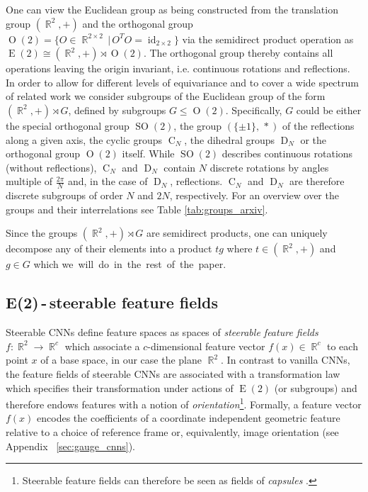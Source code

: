 \documentclass{article}
\newcommand{\apx}{Appendix\xspace
}
\DeclareMathOperator*{\R}{\mathbb{R}}
\newcommand{\E}[1]{\ensuremath{\operatorname{E}(#1)}}
\renewcommand{\O}[1]{\ensuremath{\operatorname{O}(#1)}}
\newcommand{\SO}[1]{\ensuremath{\operatorname{SO}(#1)}}
\newcommand{\DN}{\ensuremath{\operatorname{D}_{\!N}}}
\newcommand{\CN}{\ensuremath{\operatorname{C}_{\!N}}}
\newlength{\secBefore}
\newlength{\secAfter}
\newlength{\subsecBefore}
\newlength{\subsecAfter}
\begin{document}
One can view the Euclidean group as being constructed from the translation group $(\R^2,+)$ and the orthogonal group $\O2=\{O\in\R^{2\times2} \,|\, O^TO=\operatorname{id}_{2\times2}\}$ via the semidirect product operation as $\E2\cong(\R^2,+)\rtimes\O2$.
The orthogonal group thereby contains all operations leaving the origin invariant, i.e. continuous rotations and reflections.
In order to allow for different levels of equivariance and to cover a wide spectrum of related work we consider subgroups of the Euclidean group of the form $(\R^2,+)\rtimes G$, defined by subgroups $G\leq\O2$.
Specifically, $G$ could be either the special orthogonal group $\SO2$, the group $(\{\pm1\},\,*)$ of the reflections along a given axis, the cyclic groups $\CN$, the dihedral groups $\DN$ or the orthogonal group $\O2$ itself.
While $\SO2$ describes continuous rotations (without reflections), $\CN$ and $\DN$ contain $N$ discrete rotations by angles multiple of $\frac{2\pi}{N}$ and, in the case of $\DN$, reflections.
$\CN$ and $\DN$ are therefore discrete subgroups of order $N$ and $2N$, respectively.
For an overview over the groups and their interrelations see Table \ref{tab:groups_arxiv}.

Since the groups $(\R^2,+)\rtimes G$ are semidirect products, one can uniquely decompose any of their elements into a product $tg$ where $t\in(\R^2,+)$ and $g\in G$ \cite{Cohen2018-IIR} which \mbox{we will do in the rest of the paper.}

 	

\vspace*{\subsecBefore}
\subsection{E(2)\,-\,steerable feature fields}
\label{sec:feature_fields}
\vspace*{\subsecAfter}


Steerable CNNs define feature spaces as spaces of \emph{steerable feature fields}
$f:\R^2\to\R^c$ which associate a $c$-dimensional feature vector $f(x)\in\R^c$ to each point $x$ of a base space, in our case the plane $\R^2$.
In contrast to vanilla CNNs, the feature fields of steerable CNNs are associated with a transformation law which specifies their transformation under actions of $\E2$ (or subgroups) and therefore endows features with a notion of \emph{orientation}\footnote{
    Steerable feature fields can therefore be seen as fields of \emph{capsules} \cite{Sabour2017-DYNCAPS}.
}.
Formally, a feature vector $f(x)$ encodes the coefficients of a coordinate independent geometric feature relative to a choice of reference frame or, equivalently, image orientation (see \apx~\ref{sec:gauge_cnns}).
\end{document}
